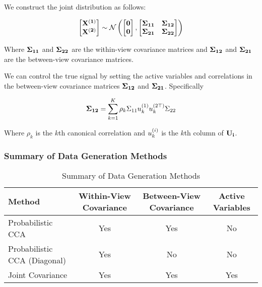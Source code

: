 We construct the joint distribution as follows:

\begin{align}\label{eq:covariance}
    \begin{bmatrix} \bold{X^{(1)}} \\ \bold{X^{(2)}} \end{bmatrix} \sim \mathcal{N} \left( \begin{bmatrix} \bold{0} \\ \bold{0} \end{bmatrix}, \begin{bmatrix} \bold{\Sigma_{11}} & \bold{\Sigma_{12}} \\ \bold{\Sigma_{21}} & \bold{\Sigma_{22}} \end{bmatrix} \right)
\end{align}

Where $\bold{\Sigma_{11}}$ and $\bold{\Sigma_{22}}$ are the within-view covariance matrices and $\bold{\Sigma_{12}}$ and $\bold{\Sigma_{21}}$ are the between-view covariance matrices.

We can control the true signal by setting the active variables and correlations in the between-view covariance
matrices $\bold{\Sigma_{12}}$ and $\bold{\Sigma_{21}}$. Specifically

\begin{align}
    \bold{\Sigma_{12}}=\sum_{k=1}^{K}\rho_k\Sigma_{11}u^{(1)}_{k}u^{(2\top)}_k\Sigma_{22}
\end{align}

Where $\rho_k$ is the $k$th canonical correlation and $u^{(i)}_k$ is the $k$th column of $\bold{U_i}$.

\subsubsection{Summary of Data Generation Methods}

\begin{table}[h]
    \centering
    \caption{Summary of Data Generation Methods}
    \begin{tabular}{l|c|c|c|}
        \textbf{Method} & \textbf{Within-View Covariance} & \textbf{Between-View Covariance} & \textbf{Active
        Variables} \\
        \hline
        Probabilistic CCA & Yes& Yes& No\\
        Probabilistic CCA (Diagonal) & Yes& No & No\\
        Joint Covariance& Yes  & Yes& Yes\\
        \hline
    \end{tabular}
    \label{table:data-generation-methods-properties}
\end{table}

